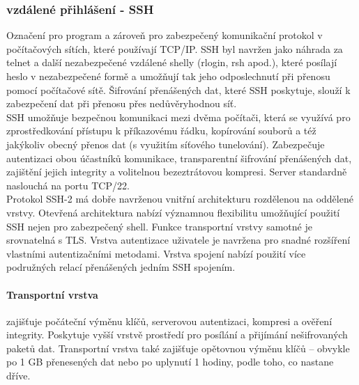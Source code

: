\documentclass[10pt,a4paper]{article}
\begin{document}
\subsubsection{vzdálené přihlášení - SSH}
Označení pro program a zároveň pro zabezpečený komunikační protokol v počítačových sítích, které používají TCP/IP. SSH byl navržen jako náhrada za telnet a další nezabezpečené vzdálené shelly (rlogin, rsh apod.), které posílají heslo v nezabezpečené formě a umožňují tak jeho odposlechnutí při přenosu pomocí počítačové sítě. Šifrování přenášených dat, které SSH poskytuje, slouží k zabezpečení dat při přenosu přes nedůvěryhodnou síť. \\
SSH umožňuje bezpečnou komunikaci mezi dvěma počítači, která se využívá pro zprostředkování přístupu k příkazovému řádku, kopírování souborů a též jakýkoliv obecný přenos dat (s využitím síťového tunelování). Zabezpečuje autentizaci obou účastníků komunikace, transparentní šifrování přenášených dat, zajištění jejich integrity a volitelnou bezeztrátovou kompresi. Server standardně naslouchá na portu TCP/22. \\
Protokol SSH-2 má dobře navrženou vnitřní architekturu rozdělenou na oddělené vrstvy. Otevřená architektura nabízí významnou flexibilitu umožňující použití SSH nejen pro zabezpečený shell. Funkce transportní vrstvy samotné je srovnatelná s TLS. Vrstva autentizace uživatele je navržena pro snadné rozšíření vlastními autentizačními metodami. Vrstva spojení nabízí použití více podružných relací přenášených jedním SSH spojením.
\paragraph{Transportní vrstva} zajišťuje počáteční výměnu klíčů, serverovou autentizaci, kompresi a ověření integrity. Poskytuje vyšší vrstvě prostředí pro posílání a přijímání nešifrovaných paketů dat. Transportní vrstva také zajišťuje opětovnou výměnu klíčů – obvykle po 1 GB přenesených dat nebo po uplynutí 1 hodiny, podle toho, co nastane dříve.
\end{document}
